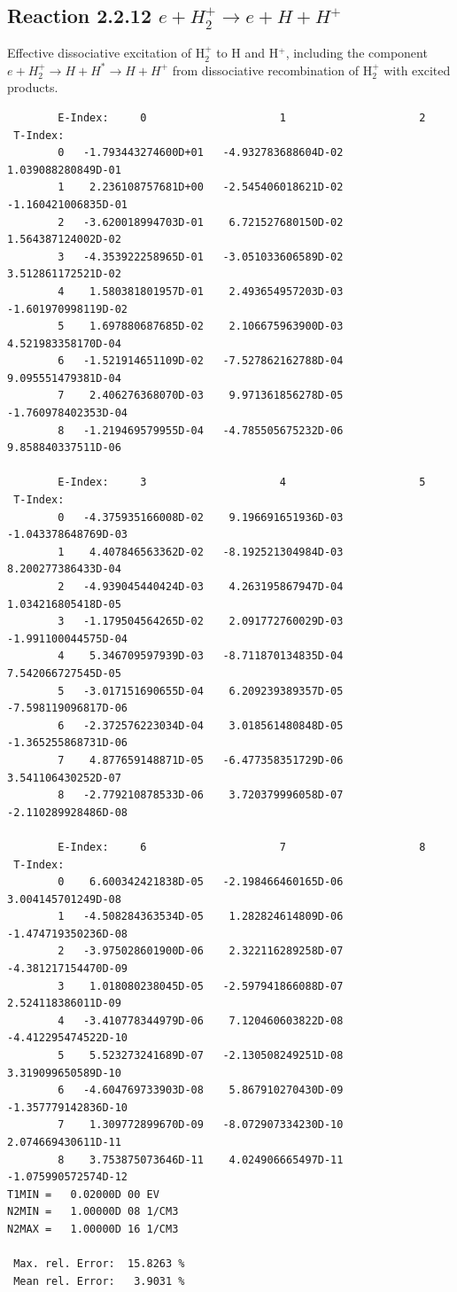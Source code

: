 \documentclass[12pt,dvipdfmx]{article}
\begin{document}
\subsection{
Reaction 2.2.12 $  e + H_2^+   \rightarrow  e + H + H^+  $
}
Effective dissociative excitation of H$_2^+$ to H and H$^+$, including the
component $e+H_2^+ \rightarrow H + H^* \rightarrow H + H^+$ from dissociative recombination of H$_2^+$ with excited products.

\begin{small}\begin{verbatim}
        E-Index:     0                     1                     2
 T-Index:
        0   -1.793443274600D+01   -4.932783688604D-02    1.039088280849D-01
        1    2.236108757681D+00   -2.545406018621D-02   -1.160421006835D-01
        2   -3.620018994703D-01    6.721527680150D-02    1.564387124002D-02
        3   -4.353922258965D-01   -3.051033606589D-02    3.512861172521D-02
        4    1.580381801957D-01    2.493654957203D-03   -1.601970998119D-02
        5    1.697880687685D-02    2.106675963900D-03    4.521983358170D-04
        6   -1.521914651109D-02   -7.527862162788D-04    9.095551479381D-04
        7    2.406276368070D-03    9.971361856278D-05   -1.760978402353D-04
        8   -1.219469579955D-04   -4.785505675232D-06    9.858840337511D-06

        E-Index:     3                     4                     5
 T-Index:
        0   -4.375935166008D-02    9.196691651936D-03   -1.043378648769D-03
        1    4.407846563362D-02   -8.192521304984D-03    8.200277386433D-04
        2   -4.939045440424D-03    4.263195867947D-04    1.034216805418D-05
        3   -1.179504564265D-02    2.091772760029D-03   -1.991100044575D-04
        4    5.346709597939D-03   -8.711870134835D-04    7.542066727545D-05
        5   -3.017151690655D-04    6.209239389357D-05   -7.598119096817D-06
        6   -2.372576223034D-04    3.018561480848D-05   -1.365255868731D-06
        7    4.877659148871D-05   -6.477358351729D-06    3.541106430252D-07
        8   -2.779210878533D-06    3.720379996058D-07   -2.110289928486D-08

        E-Index:     6                     7                     8
 T-Index:
        0    6.600342421838D-05   -2.198466460165D-06    3.004145701249D-08
        1   -4.508284363534D-05    1.282824614809D-06   -1.474719350236D-08
        2   -3.975028601900D-06    2.322116289258D-07   -4.381217154470D-09
        3    1.018080238045D-05   -2.597941866088D-07    2.524118386011D-09
        4   -3.410778344979D-06    7.120460603822D-08   -4.412295474522D-10
        5    5.523273241689D-07   -2.130508249251D-08    3.319099650589D-10
        6   -4.604769733903D-08    5.867910270430D-09   -1.357779142836D-10
        7    1.309772899670D-09   -8.072907334230D-10    2.074669430611D-11
        8    3.753875073646D-11    4.024906665497D-11   -1.075990572574D-12
T1MIN =   0.02000D 00 EV
N2MIN =   1.00000D 08 1/CM3
N2MAX =   1.00000D 16 1/CM3

 Max. rel. Error:  15.8263 %
 Mean rel. Error:   3.9031 %

\end{verbatim}\end{small}
\end{document}
